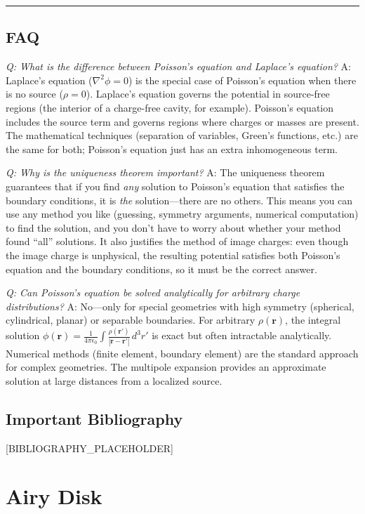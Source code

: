 \documentclass[11pt,openright]{book}
\begin{document}
\bigskip
\hrule
\bigskip
\section*{FAQ}

\textit{Q: What is the difference between Poisson's equation and Laplace's equation?}
A: Laplace's equation ($\nabla^2\phi = 0$) is the special case of Poisson's equation when there is no source ($\rho = 0$). Laplace's equation governs the potential in source-free regions (the interior of a charge-free cavity, for example). Poisson's equation includes the source term and governs regions where charges or masses are present. The mathematical techniques (separation of variables, Green's functions, etc.) are the same for both; Poisson's equation just has an extra inhomogeneous term.

\textit{Q: Why is the uniqueness theorem important?}
A: The uniqueness theorem guarantees that if you find \emph{any} solution to Poisson's equation that satisfies the boundary conditions, it is \emph{the} solution---there are no others. This means you can use any method you like (guessing, symmetry arguments, numerical computation) to find the solution, and you don't have to worry about whether your method found ``all'' solutions. It also justifies the method of image charges: even though the image charge is unphysical, the resulting potential satisfies both Poisson's equation and the boundary conditions, so it must be the correct answer.

\textit{Q: Can Poisson's equation be solved analytically for arbitrary charge distributions?}
A: No---only for special geometries with high symmetry (spherical, cylindrical, planar) or separable boundaries. For arbitrary $\rho(\mathbf{r})$, the integral solution $\phi(\mathbf{r}) = \frac{1}{4\pi\epsilon_0}\int\frac{\rho(\mathbf{r}')}{|\mathbf{r}-\mathbf{r}'|}\,d^3r'$ is exact but often intractable analytically. Numerical methods (finite element, boundary element) are the standard approach for complex geometries. The multipole expansion provides an approximate solution at large distances from a localized source.
\section*{Important Bibliography}

[BIBLIOGRAPHY_PLACEHOLDER]


\chapter{Airy Disk}
\end{document}
